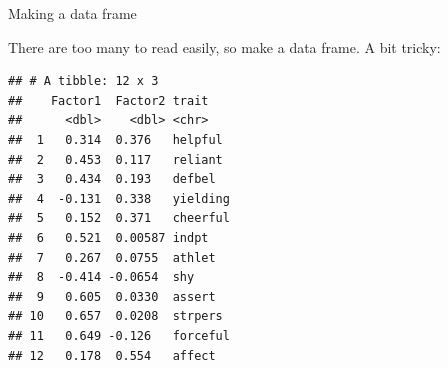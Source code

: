 \documentclass[
  ignorenonframetext,
]{beamer}
\newenvironment{Shaded}{\begin{snugshade}}{\end{snugshade}}
\newcommand{\DataTypeTok}[1]{\textcolor[rgb]{0.13,0.29,0.53}{#1}}
\newcommand{\DecValTok}[1]{\textcolor[rgb]{0.00,0.00,0.81}{#1}}
\newcommand{\FloatTok}[1]{\textcolor[rgb]{0.00,0.00,0.81}{#1}}
\newcommand{\KeywordTok}[1]{\textcolor[rgb]{0.13,0.29,0.53}{\textbf{#1}}}
\newcommand{\NormalTok}[1]{#1}
\newcommand{\OperatorTok}[1]{\textcolor[rgb]{0.81,0.36,0.00}{\textbf{#1}}}
\newcommand{\StringTok}[1]{\textcolor[rgb]{0.31,0.60,0.02}{#1}}
\begin{document}
\begin{frame}[fragile]{Making a data frame}
\protect\hypertarget{making-a-data-frame}{}

There are too many to read easily, so make a data frame. A bit tricky:

\footnotesize

\begin{Shaded}
\end{Shaded}

\begin{verbatim}
## # A tibble: 12 x 3
##    Factor1  Factor2 trait   
##      <dbl>    <dbl> <chr>   
##  1   0.314  0.376   helpful 
##  2   0.453  0.117   reliant 
##  3   0.434  0.193   defbel  
##  4  -0.131  0.338   yielding
##  5   0.152  0.371   cheerful
##  6   0.521  0.00587 indpt   
##  7   0.267  0.0755  athlet  
##  8  -0.414 -0.0654  shy     
##  9   0.605  0.0330  assert  
## 10   0.657  0.0208  strpers 
## 11   0.649 -0.126   forceful
## 12   0.178  0.554   affect
\end{verbatim}

\normalsize

\end{frame}
\end{document}
